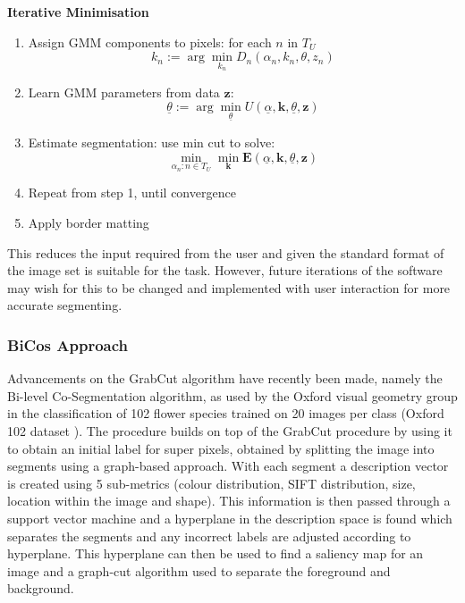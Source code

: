 \documentclass[11pt, titlepage, oneside]{article}
\theoremstyle{plain}
\theoremstyle{definition}
\theoremstyle{remark}
\begin{document}
			\textbf{Iterative Minimisation}
			\begin{enumerate}
				
				\item Assign GMM components to pixels: for each $n$ in $T_U$
					\[
						k_n := \arg \min_{k_n} D_n (\alpha_n,k_n, \theta, z_n)
					\]
				\item Learn GMM parameters from data $\mathbf{z}$:
					\[
						\underline{\theta} := \arg \min_{\underline{\theta}} U(\underline{\alpha}, \mathbf{k}, \underline{\theta}, \mathbf{z})
					\]
				\item Estimate segmentation: use min cut to solve:
					\[
						\min_{\alpha_n: n\in T_U} \min_{\mathbf{k}} \mathbf{E}(\underline{\alpha}, \mathbf{k}, \underline{\theta}, \mathbf{z})
					\]
				\item Repeat from step 1, until convergence
				\item Apply border matting
				
			\end{enumerate}
			 This reduces the input required from the user and given the standard format of the image set is suitable for the task. However, future iterations of the software may wish for this to be changed and implemented with user interaction for more accurate segmenting.
			 \fi
		\subsubsection{BiCos Approach}
			Advancements on the GrabCut\cite{grabcut} algorithm have recently been made, namely the Bi-level Co-Segmentation\cite{bicos} algorithm, as used by the Oxford visual geometry group\cite{robot} in the classification of 102 flower species trained on 20 images per class (Oxford 102 dataset \cite{oxford102}). The procedure builds on top of the GrabCut procedure by using it to obtain an initial label for super pixels, obtained by  splitting the image into segments using a graph-based approach\cite{felz}. With each segment a description vector is created using 5 sub-metrics (colour distribution, SIFT\cite{sift} distribution, size, location within the image and shape). This information is then passed through a support vector machine and a hyperplane in the description space is found which separates the segments and any incorrect labels are adjusted according to hyperplane. This hyperplane can then be used to find a saliency map for an image and a graph-cut algorithm used to separate the foreground and background.
\end{document}
